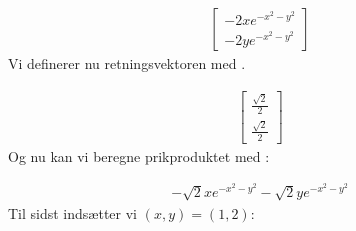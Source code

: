 \documentclass[letterpaper,10pt,english]{jupyterBook}
\begin{document}
\begin{sphinxVerbatim}[commandchars=\\\{\}]
      
                      
\end{sphinxVerbatim}
\begin{equation*}
\begin{split}\displaystyle \left[\begin{matrix}- 2 x e^{- x^{2} - y^{2}}\\- 2 y e^{- x^{2} - y^{2}}\end{matrix}\right]\end{split}
\end{equation*}
Vi definerer nu retningsvektoren med .

\begin{sphinxVerbatim}[commandchars=\\\{\}]
  \PYG{p}{[} \PYG{p}{]}
\end{sphinxVerbatim}
\begin{equation*}
\begin{split}\displaystyle \left[\begin{matrix}\frac{\sqrt{2}}{2}\\\frac{\sqrt{2}}{2}\end{matrix}\right]\end{split}
\end{equation*}
Og nu kan vi beregne prikproduktet med :

\begin{sphinxVerbatim}[commandchars=\\\{\}]
  
\end{sphinxVerbatim}
\begin{equation*}
\begin{split}\displaystyle - \sqrt{2} x e^{- x^{2} - y^{2}} - \sqrt{2} y e^{- x^{2} - y^{2}}\end{split}
\end{equation*}
Til sidst indsætter vi \((x, y) = (1, 2)\):
\end{document}
